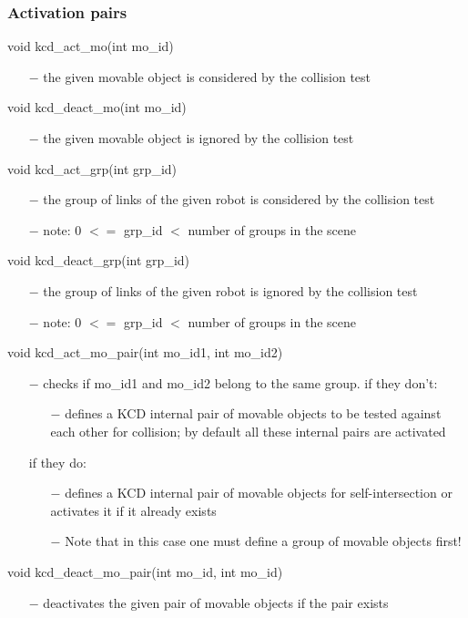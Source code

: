 \subsubsection{Activation pairs}

void kcd\_act\_mo(int mo\_id)
\begin{itemize}
\item[$-$] the given movable object is considered by the collision test
\end{itemize}
void kcd\_deact\_mo(int mo\_id)
\begin{itemize}
\item[$-$] the given movable object is ignored by the collision test
\end{itemize}
void kcd\_act\_grp(int grp\_id)
\begin{itemize}
\item[$-$] the group of links of the given robot is considered 
  by the collision test
\item[$-$] note: 0 $<=$ grp\_id $<$ number of groups in the scene
\end{itemize}
void kcd\_deact\_grp(int grp\_id)
\begin{itemize}
\item[$-$] the group of links of the given robot is ignored by the collision test
\item[$-$] note: 0 $<=$ grp\_id $<$ number of groups in the scene
\end{itemize}
void kcd\_act\_mo\_pair(int mo\_id1, int mo\_id2)
\begin{itemize}
\item[$-$] checks if mo\_id1 and mo\_id2 belong to the same group.\newline
  if they don't:
  \begin{itemize}
  \item[$-$] defines a KCD internal pair of movable objects to be tested against
    each other for collision; by default all these internal pairs are activated
  \end{itemize}
  if they do:
  \begin{itemize}
  \item[$-$] defines a KCD internal pair of movable objects for self-intersection
    or activates it if it already exists
  \item[$-$] Note that in this case one must define a group of movable
objects first!
  \end{itemize}
\end{itemize}
void kcd\_deact\_mo\_pair(int mo\_id, int mo\_id)
\begin{itemize}
\item[$-$] deactivates the given pair of movable objects if the pair exists
\end{itemize}
